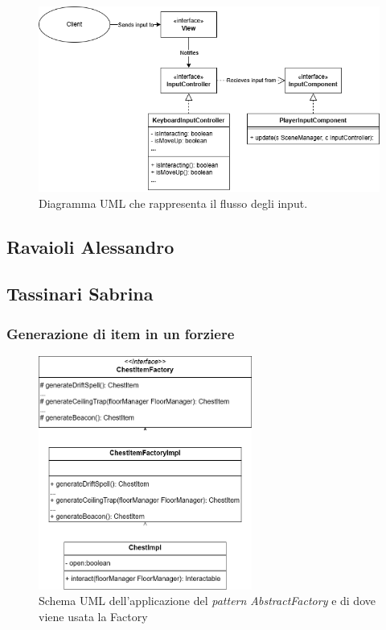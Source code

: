 \documentclass{report}
\begin{document}
\begin{figure}[H]
    \centering
    \includegraphics[width=13cm]{ObserverPattern.png}
    \caption{Diagramma UML che rappresenta il flusso degli input.}
    \label{img:ObserverPattern.png}
\end{figure}


\subsection{Ravaioli Alessandro}

\subsection{Tassinari Sabrina}

\subsubsection{Generazione di item in un forziere}

\begin{figure}[H]
    \centering
    \includegraphics[width=7cm]{patternFactory.drawio.png}
    \caption{Schema UML dell'applicazione del \textit{pattern AbstractFactory} e di dove viene usata la Factory}
    \label{img:chestItemFactory}
\end{figure}
\end{document}
